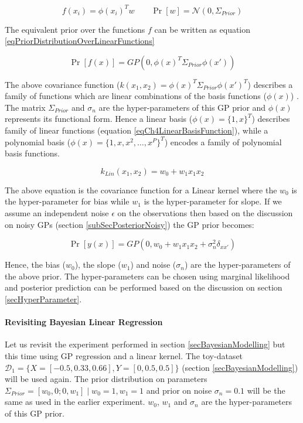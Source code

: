 \begin{equation}\label{eqBLRRevisited}
    f(x_{i}) = \phi(x_{i})^{T}w
\quad \quad \Pr[w] = \mathcal{N}(0, \Sigma_{Prior}) 
\end{equation}

The equivalent prior over the functions $f$ can be written as equation \ref{eqPriorDistributionOverLinearFunctions}

\begin{equation}\label{eqPriorDistributionOverLinearFunctions}
    \Pr[f(x)] = GP(0, \phi(x)^{T} \Sigma_{Prior} \phi(x'))
\end{equation}

The above covariance function ($k(x_{1}, x_{2}) = \phi(x)^{T} \Sigma_{Prior} \phi(x')^{T}$) describes a family of functions which are linear combinations of the basis functions ($\phi(x)$) \cite{bishop2006pattern}. The matrix $\Sigma_{Prior}$ and $\sigma_{n}$ are the hyper-parameters of this GP prior and $\phi(x)$ represents its functional form. Hence a linear basis ($\phi(x) = \{1, x\}^{T}$) describes family of linear functions (equation \ref{eqCh4LinearBasisFunction}), while a polynomial basis ($\phi(x) = \{1, x, x^2, \ldots, x^P\}^{T}$) encodes a family of polynomial basis functions.

\begin{equation}\label{eqCh4LinearBasisFunction}
k_{Lin}(x_{1}, x_{2}) = w_{0} + w_{1}x_{1}x_{2}
\end{equation}

The above equation is the covariance function for a Linear kernel where the $w_{0}$ is the hyper-parameter for bias while $w_{1}$ is the hyper-parameter for slope. If we assume an independent noise $\epsilon$ on the observations then based on the discussion on noisy GPs (section \ref{subSecPosteriorNoisy}) the GP prior becomes:

\begin{equation}\label{eqNoisyPriorDistributionOverLinearFunctions}
    \Pr[y(x)] = GP(0, w_{0} + w_{1}x_{1}x_{2} + \sigma_{n}^2\delta_{xx'})
\end{equation}

Hence, the bias ($w_{0}$), the slope ($w_{1}$) and noise ($\sigma_{n}$) are the hyper-parameters of the above prior. The hyper-parameters can be chosen using marginal likelihood and posterior prediction can be performed based on the discussion on section \ref{secHyperParameter}. 

\paragraph{Revisiting Bayesian Linear Regression}\label{paraLinearGPExperiment}
Let us revisit the experiment performed in section \ref{secBayesianModelling} but this time using GP regression and a linear kernel. The toy-dataset $\mathcal{D}_{1} = \{X = [-0.5, 0.33, 0.66], Y = [0, 0.5, 0.5]\}$ (section \ref{secBayesianModelling}) will be used again. The prior distribution on parameters $\Sigma_{Prior} = [w_{0}, 0; 0, w_{1}] \mid w_{0} = 1, w_{1} = 1$ and prior on noise $\sigma_{n} = 0.1$ will be the same as used in the earlier experiment. $w_{0}$, $w_{1}$ and $\sigma_{n}$ are the hyper-parameters of this GP prior. 

